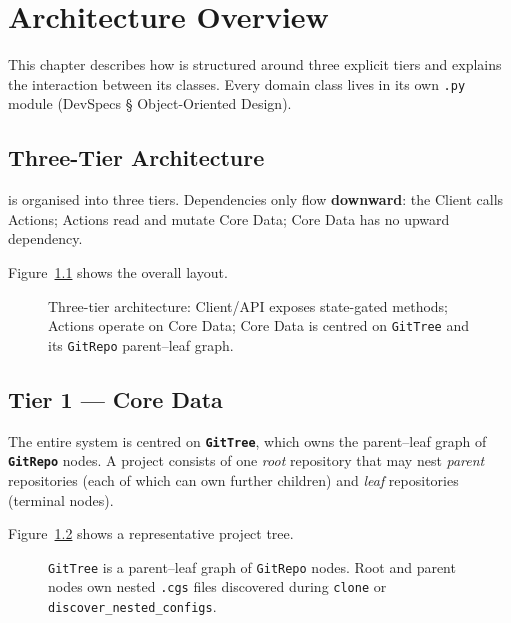 
\chapter{Architecture Overview}
\label{chap:architecture}

This chapter describes how \cgspkg{} is structured around three explicit tiers
and explains the interaction between its classes.  Every domain class lives in
its own \texttt{.py} module (DevSpecs § Object-Oriented Design).

\section{Three-Tier Architecture}
\label{sec:three-tier}

\cgspkg{} is organised into three tiers.  Dependencies only flow
\textbf{downward}: the Client calls Actions; Actions read and mutate Core Data;
Core Data has no upward dependency.

Figure~\ref{fig:three-tier} shows the overall layout.

\begin{figure}[ht]
\centering
\caption{Three-tier architecture: Client/API exposes state-gated methods;
  Actions operate on Core Data; Core Data is centred on \texttt{GitTree} and
  its \texttt{GitRepo} parent--leaf graph.}
\label{fig:three-tier}

\end{figure}

\section{Tier 1 — Core Data}
\label{sec:tier-core}

The entire system is centred on \textbf{\texttt{GitTree}}, which owns the
parent--leaf graph of \textbf{\texttt{GitRepo}} nodes.  A project consists of
one \emph{root} repository that may nest \emph{parent} repositories (each of
which can own further children) and \emph{leaf} repositories (terminal nodes).

Figure~\ref{fig:gittree-nodes} shows a representative project tree.

\begin{figure}[ht]
\centering
\caption{\texttt{GitTree} is a parent--leaf graph of \texttt{GitRepo} nodes.
  Root and parent nodes own nested \texttt{.cgs} files discovered during
  \texttt{clone} or \texttt{discover\_nested\_configs}.}
\label{fig:gittree-nodes}

\end{figure}

